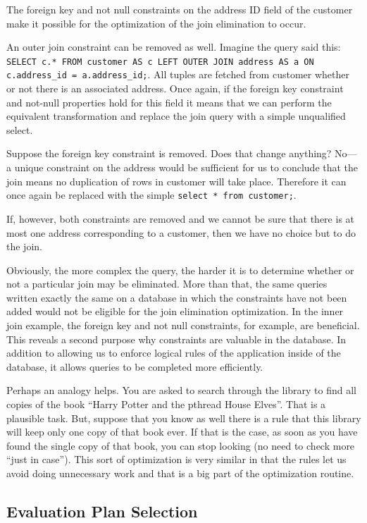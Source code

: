 \documentclass[a4paper]{report}
\begin{document}
The foreign key and not null constraints on the address ID field of the customer make it possible for the optimization of the join elimination to occur.

An outer join constraint can be removed as well. Imagine the query said this: \texttt{SELECT c.* FROM customer AS c LEFT OUTER JOIN address AS a ON c.address\_id = a.address\_id;}. All tuples are fetched from customer whether or not there is an associated address. Once again, if the foreign key constraint and not-null properties hold for this field it means that we can perform the equivalent transformation and replace the join query with a simple unqualified select. 

Suppose the foreign key constraint is removed. Does that change anything? No---a unique constraint on the address would be sufficient for us to conclude that the join means no duplication of rows in customer will take place. Therefore it can once again be replaced with the simple \texttt{select * from customer;}.

If, however, both constraints are removed and we cannot be sure that there is at most one address corresponding to a customer, then we have no choice but to do the join.

Obviously, the more complex the query, the harder it is to determine whether or not a particular join may be eliminated. More than that, the same queries written exactly the same on a database in which the constraints have not been added would not be eligible for the join elimination optimization. In the inner join example, the foreign key and not null constraints, for example, are beneficial. This reveals a second purpose why constraints are valuable in the database. In addition to allowing us to enforce logical rules of the application inside of the database, it allows queries to be completed more efficiently.

Perhaps an analogy helps. You are asked to search through the library to find all copies of the book ``Harry Potter and the pthread House Elves''. That is a plausible task. But, suppose that you know as well there is a rule that this library will keep only one copy of that book ever. If that is the case, as soon as you have found the single copy of that book, you can stop looking (no need to check more ``just in case''). This sort of optimization is very similar in that the rules let us avoid doing unnecessary work and that is a big part of the optimization routine.

\subsection*{Evaluation Plan Selection}
\end{document}
